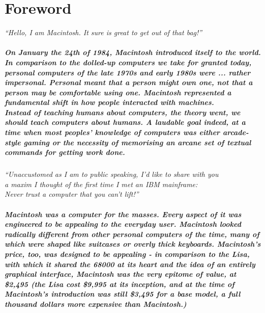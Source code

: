 
\chapter{Foreword}

\begin{center}
\textit{``Hello, I am Macintosh. It sure is great to get out of that bag!''}
\end{center}

\paragraph{%
On January the 24th of 1984, Macintosh introduced itself to the world. In comparison %
to the dolled-up computers we take for granted today, personal computers of the late %
1970s and early 1980s were ... rather impersonal. Personal meant that a person might %
own one, not that a person may be comfortable using one. Macintosh represented a fundamental %
shift in how people interacted with machines. \\
\textit{Instead of teaching humans about computers,} the theory went, %
\textit{we should teach computers about humans.} A laudable goal indeed, at a %
time when most peoples' knowledge of computers was either arcade-style gaming or %
the necessity of memorising an arcane set of textual commands for getting work done. %
}

\begin{center}
\textit{``Unaccustomed as I am to public speaking, I'd like to share with you\\  a %
maxim I thought of the first time I met an IBM mainframe: \\Never trust a computer %
that you can't lift!''}
\end{center}

\paragraph{%
Macintosh was a computer for the masses. Every aspect of it was engineered to be %
appealing to the everyday user. Macintosh looked radically different from other %
personal computers of the time, many of which were shaped like suitcases or overly %
thick keyboards. Macintosh's price, too, was designed to be appealing - in comparison %
to the Lisa, with which it shared the 68000 at its heart and the idea of an entirely %
graphical interface, Macintosh was the very epitome of value, at \$2,495 (the Lisa cost %
\$9,995 at its inception, and at the time of Macintosh's introduction was still \$3,495 %
for a base model, a full thousand dollars more expensive than Macintosh.) %
}

